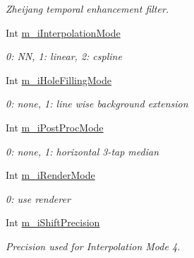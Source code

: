 \begin{DoxyCompactItemize}
\begin{DoxyCompactList}\small\item\em Zheijang temporal enhancement filter. \end{DoxyCompactList}\item 
\mbox{\label{class_t_app_renderer_cfg_a0a31ccbafadf73e199baa7755cc98055}} 
Int \hyperlink{class_t_app_renderer_cfg_a0a31ccbafadf73e199baa7755cc98055}{m\+\_\+i\+Interpolation\+Mode}
\begin{DoxyCompactList}\small\item\em 0\+: NN, 1\+: linear, 2\+: cspline \end{DoxyCompactList}\item 
\mbox{\label{class_t_app_renderer_cfg_aea8eefc71b5943540366960ef0fb3ad2}} 
Int \hyperlink{class_t_app_renderer_cfg_aea8eefc71b5943540366960ef0fb3ad2}{m\+\_\+i\+Hole\+Filling\+Mode}
\begin{DoxyCompactList}\small\item\em 0\+: none, 1\+: line wise background extension \end{DoxyCompactList}\item 
\mbox{\label{class_t_app_renderer_cfg_af55dc05f8c3e9175ab894aeda2148c1b}} 
Int \hyperlink{class_t_app_renderer_cfg_af55dc05f8c3e9175ab894aeda2148c1b}{m\+\_\+i\+Post\+Proc\+Mode}
\begin{DoxyCompactList}\small\item\em 0\+: none, 1\+: horizontal 3-\/tap median \end{DoxyCompactList}\item 
\mbox{\label{class_t_app_renderer_cfg_a79000bfe025c62cce310ad3393131e06}} 
Int \hyperlink{class_t_app_renderer_cfg_a79000bfe025c62cce310ad3393131e06}{m\+\_\+i\+Render\+Mode}
\begin{DoxyCompactList}\small\item\em 0\+: use renderer \end{DoxyCompactList}\item 
\mbox{\label{class_t_app_renderer_cfg_a19eabd993fba32ce00131b5c0042fb9d}} 
Int \hyperlink{class_t_app_renderer_cfg_a19eabd993fba32ce00131b5c0042fb9d}{m\+\_\+i\+Shift\+Precision}
\begin{DoxyCompactList}\small\item\em Precision used for Interpolation Mode 4. \end{DoxyCompactList}\item 

\end{DoxyCompactItemize}
